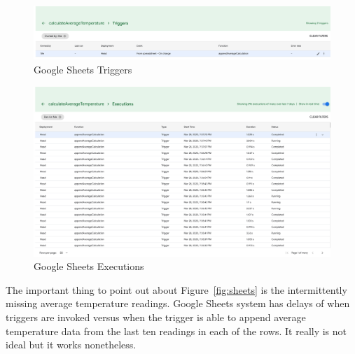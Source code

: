 \documentclass{article}
\begin{document}
\begin{figure}[H]
\center
\includegraphics[width=\textwidth]{images/particle-argon-gcp-triggers.png}
\caption{Google Sheets Triggers}
\label{fig:trigger}
\end{figure}

\begin{figure}[H]
\center
\includegraphics[width=\textwidth]{images/particle-argon-gcp-executions.png}
\caption{Google Sheets Executions}
\label{fig:executions}
\end{figure}

The important thing to point out about Figure~\ref{fig:sheets} is the intermittently missing average temperature readings. Google Sheets system has delays of when triggers are invoked versus when the trigger is able to append average temperature data from the last ten readings in each of the rows. It really is not ideal but it works nonetheless.
\end{document}
